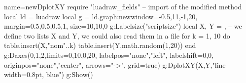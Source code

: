 \begin{luadraw}{name=newDplotXY}
require "luadraw_fields" -- import of the modified method
local ld = luadraw
local g = ld.graph:new{window={-0.5,11,-1,20}, margin={0.5,0.5,0.5,1}, size={10,10,0}}
g:Labelsize("scriptsize")
local X, Y = {}, {} -- we define two lists X and Y, we could also read them in a file
for k = 1, 10 do
    table.insert(X,"nom"..k)
    table.insert(Y,math.random(1,20))
end
g:Daxes({0,1,2},{limits={{0,10},{0,20}}, labelpos={"none","left"},
    labelshift={0,0}, originpos={"none","center"}, arrows="->", grid=true})
g:DplotXY(X,Y,"line width=0.8pt, blue")
g:Show()
\end{luadraw}
